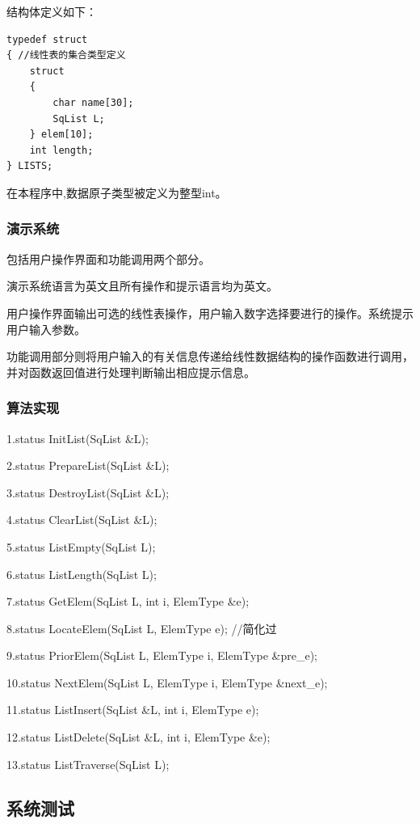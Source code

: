 \documentclass[supercite]{Experimental_Report}
\theoremstyle{definition}
\begin{document}
结构体定义如下：

\begin{lstlisting}
typedef struct
{ //线性表的集合类型定义
    struct
    {
        char name[30];
        SqList L;
    } elem[10];
	int length;
} LISTS;

\end{lstlisting}

在本程序中,数据原子类型被定义为整型int。

\subsubsection{演示系统}

包括用户操作界面和功能调用两个部分。

演示系统语言为英文且所有操作和提示语言均为英文。

用户操作界面输出可选的线性表操作，用户输入数字选择要进行的操作。系统提示用户输入参数。

功能调用部分则将用户输入的有关信息传递给线性数据结构的操作函数进行调用，并对函数返回值进行处理判断输出相应提示信息。

\subsubsection{算法实现}

1.status InitList(SqList &L);

2.status PrepareList(SqList &L);

3.status DestroyList(SqList &L);

4.status ClearList(SqList &L);

5.status ListEmpty(SqList L);

6.status ListLength(SqList L);

7.status GetElem(SqList L, int i, ElemType &e);

8.status LocateElem(SqList L, ElemType e); //简化过

9.status PriorElem(SqList L, ElemType i, ElemType &pre_e);

10.status NextElem(SqList L, ElemType i, ElemType &next_e);

11.status ListInsert(SqList &L, int i, ElemType e);

12.status ListDelete(SqList &L, int i, ElemType &e);

13.status ListTraverse(SqList L);

\subsection{系统测试}
\end{document}
